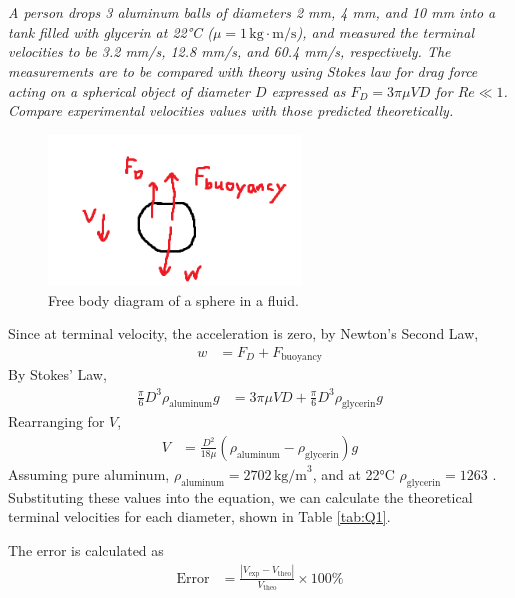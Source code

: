 \section{}
\textit{A person drops 3 aluminum balls of diameters 2 mm, 4 mm, and 10 mm into a tank filled with glycerin at 22°C ($\mu = 1 \, \text{kg} \cdot \text{m/s}$), and measured the terminal velocities to be 3.2 mm/s, 12.8 mm/s, and 60.4 mm/s, respectively. The measurements are to be compared with theory using Stokes law for drag force acting on a spherical object of diameter $D$ expressed as $F_D = 3\pi\mu VD$ for $Re \ll 1$. Compare experimental velocities values with those predicted theoretically.}

\begin{figure}[H]
    \centering
    \includegraphics[width=0.6\textwidth]{Questions/Figures/Q1 FBD.png}
    \caption{Free body diagram of a sphere in a fluid.} 
    \label{fig:Q1 FBD}
\end{figure}
Since at terminal velocity, the acceleration is zero, by Newton's Second Law,
\begin{align*}
    w &= F_D + F_{\text{buoyancy}} 
\end{align*}
By Stokes' Law, 
\begin{align*}
    \frac{\pi}{6}D^3\rho_{\text{aluminum}}g &= 3\pi\mu VD + \frac{\pi}{6}D^3\rho_{\text{glycerin}}g
\end{align*}
Rearranging for $V$,
\begin{align*}
    V &= \frac{D^2}{18\mu}\left(\rho_{\text{aluminum}} - \rho_{\text{glycerin}}\right)g
\end{align*}
Assuming pure aluminum, $\rho_{\text{aluminum}} = 2702 \, \text{kg/m}^3$, and at 22°C $\rho_{\text{glycerin}} = 1263$ \cite{cengel_thermodynamics:_2024}. Substituting these values into the equation, we can calculate the theoretical terminal velocities for each diameter, shown in Table \ref{tab:Q1}.

The error is calculated as
\begin{align*}
    \text{Error} &= \frac{|V_{\text{exp}} - V_{\text{theo}}|}{V_{\text{theo}}}\times 100\%
\end{align*}

